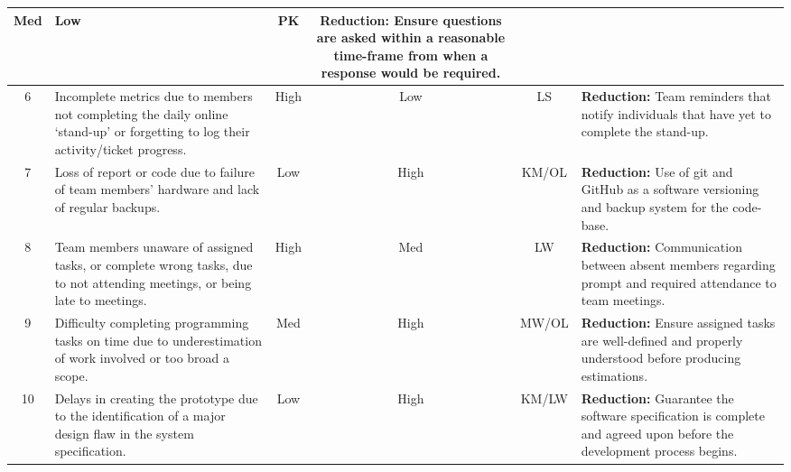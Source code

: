 \begin{table}[h!]
\begin{tabularx}{\textwidth}{|c|X|c|c|c|X|}
            Med &
            Low &
            PK &
            \textbf{Reduction:} Ensure questions are asked within a reasonable time-frame from when a response would be required. \\
            \hline
            6 &
            Incomplete metrics due to members not completing the daily online `stand-up' or forgetting to log their activity/ticket progress. &
            High &
            Low & LS &
            \textbf{Reduction:} Team reminders that notify individuals that have yet to complete the stand-up. \\
            \hline
            7 &
            Loss of report or code due to failure of team members' hardware and lack of regular backups. &
            Low &
            High & KM/OL &
            \textbf{Reduction:} Use of git and GitHub as a software versioning and backup system for the code-base. \\
            \hline
            8 &
            Team members unaware of assigned tasks, or complete wrong tasks, due to not attending meetings, or being late to meetings. &
            High &
            Med &
            LW &
            \textbf{Reduction:} Communication between absent members regarding prompt and required attendance to team meetings. \\
            \hline
            9 &
            Difficulty completing programming tasks on time due to underestimation of work involved or too broad a scope. &
            Med &
            High &
            MW/OL &
            \textbf{Reduction:} Ensure assigned tasks are well-defined and properly understood before producing estimations. \\
            \hline
            10 &
            Delays in creating the prototype due to the identification of a major design flaw in the system specification. &
            Low &
            High &
            KM/LW &
            \textbf{Reduction:} Guarantee the software specification is complete and agreed upon before the development process begins. \\
            \hline
        \end{tabularx}
    \end{table}

